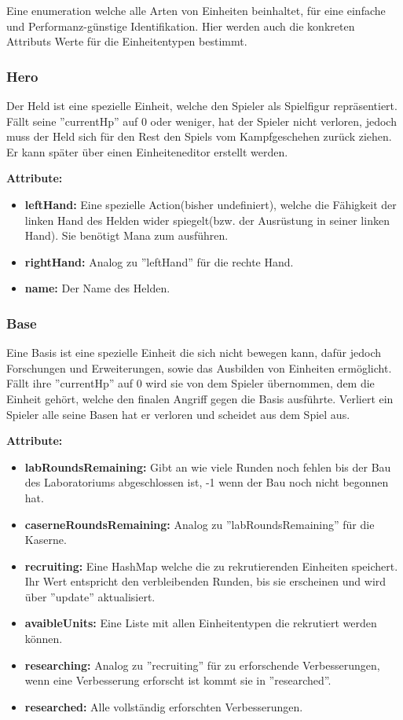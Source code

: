 \documentclass[fontsize=12pt,paper=a4,twoside]{scrartcl}
\begin{document}
Eine enumeration welche alle Arten von Einheiten beinhaltet, für eine einfache und Performanz-günstige Identifikation. Hier werden auch die konkreten Attributs Werte für die Einheitentypen bestimmt.

\subsubsection{Hero}

Der Held ist eine spezielle Einheit, welche den Spieler als Spielfigur repräsentiert. Fällt seine ''currentHp'' auf 0 oder weniger, hat der Spieler nicht verloren, jedoch muss der Held sich für den Rest den Spiels vom Kampfgeschehen zurück ziehen. Er kann später über einen Einheiteneditor erstellt werden.

\textbf{Attribute:}
\begin{itemize}
\item \textbf{leftHand:} Eine spezielle Action(bisher undefiniert), welche die Fähigkeit der linken Hand des Helden wider spiegelt(bzw. der Ausrüstung in seiner linken Hand). Sie benötigt Mana zum ausführen.
\item \textbf{rightHand:} Analog zu ''leftHand'' für die rechte Hand.
\item \textbf{name:} Der Name des Helden.
\end{itemize}

\subsubsection{Base}
Eine Basis ist eine spezielle Einheit die sich nicht bewegen kann, dafür jedoch Forschungen und Erweiterungen, sowie das Ausbilden von Einheiten ermöglicht. Fällt ihre ''currentHp'' auf 0 wird sie von dem Spieler übernommen, dem die Einheit gehört, welche den finalen Angriff gegen die Basis ausführte. Verliert ein Spieler alle seine Basen hat er verloren und scheidet aus dem Spiel aus.

\textbf{Attribute:}
\begin{itemize}
\item \textbf{labRoundsRemaining:} Gibt an wie viele Runden noch fehlen bis der Bau des Laboratoriums abgeschlossen ist, -1 wenn der Bau noch nicht begonnen hat.
\item \textbf{caserneRoundsRemaining:} Analog zu ''labRoundsRemaining'' für die Kaserne.
\item \textbf{recruiting:} Eine HashMap welche die zu rekrutierenden Einheiten speichert. Ihr Wert entspricht den verbleibenden Runden, bis sie erscheinen und wird über ''update'' aktualisiert.
\item \textbf{avaibleUnits:} Eine Liste mit allen Einheitentypen die rekrutiert werden können.
\item \textbf{researching:} Analog zu ''recruiting'' für zu erforschende Verbesserungen, wenn eine Verbesserung erforscht ist kommt sie in ''researched''.
\item \textbf{researched:} Alle vollständig erforschten Verbesserungen.
\end{itemize}
\end{document}
